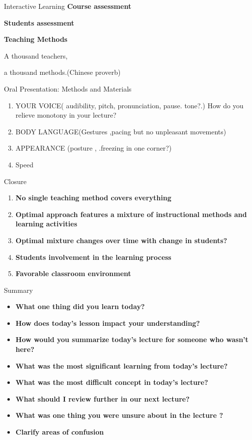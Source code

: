 \documentclass[
  ignorenonframetext,
]{beamer}
\providecommand{\tightlist}{%
  \setlength{\itemsep}{0pt}\setlength{\parskip}{0pt}}\usepackage{longtable,booktabs,array}
\begin{document}
\begin{frame}{Interactive Learning}
\protect\hypertarget{interactive-learning}{}
\textbf{Course assessment}

\textbf{Students assessment}

{\textbf{Teaching Methods}}

A thousand teachers,

a thousand methods.(Chinese proverb)
\end{frame}

\begin{frame}{Oral Presentation: Methods and Materials}
\protect\hypertarget{oral-presentation-methods-and-materials}{}
\begin{enumerate}
\item
  {YOUR VOICE}( audibility, pitch, pronunciation, pause. tone?.) How do
  you relieve monotony in your lecture?
\item
  {BODY LANGUAGE}(Gestures ,pacing but no unpleasant movements)
\item
  {APPEARANCE} (posture , .freezing in one corner?)
\item
  {Speed}
\end{enumerate}
\end{frame}

\begin{frame}{Closure}
\protect\hypertarget{closure}{}
\begin{enumerate}
\tightlist
\item
  \textbf{No single teaching method covers everything}
\item
  \textbf{Optimal approach features a mixture of instructional methods
  and learning activities}
\item
  \textbf{Optimal mixture changes over time with change in students?}
\item
  \textbf{Students involvement in the learning process}
\item
  \textbf{Favorable classroom environment}
\end{enumerate}
\end{frame}

\begin{frame}{Summary}
\protect\hypertarget{summary}{}
\begin{itemize}
\item
  {\textbf{What one thing did you learn today?}}
\item
  \textbf{How does today's lesson impact your understanding?}
\item
  {\textbf{How would you summarize today's lecture for someone who
  wasn't here?}}
\item
  \textbf{What was the most significant learning from today's lecture?}
\item
  {\textbf{What was the most difficult concept in today's lecture?}}
\item
  \textbf{What should I review further in our next lecture?}
\item
  {\textbf{What was one thing you were unsure about in the lecture ?}}
\item
  \textbf{Clarify areas of confusion}
\end{itemize}
\end{frame}
\end{document}
